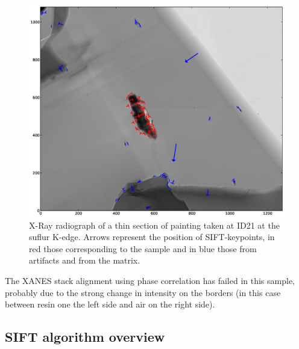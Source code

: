 \documentclass[preprint]{iucr}
\begin{document}
\begin{figure}
\label{fig:sample}
\begin{center}
\includegraphics[width=15cm]{features.eps}
\caption{ X-Ray radiograph of a thin section of painting
taken at ID21 at the suflur K-edge. Arrows represent the position of
SIFT-keypoints, in red those corresponding to the sample and in blue those from artifacts and from
the matrix.}
\end{center}
\end{figure}

The XANES stack alignment using phase correlation has failed in this sample,
probably due to the strong change in intensity on the borders (in this case 
between resin one the left side and air on the right side).

\subsection{SIFT algorithm overview}

\end{document}
